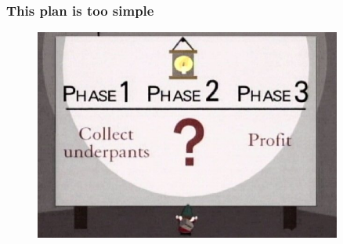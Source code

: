 \begin{frame}
\frametitle{This plan is too simple}

\begin{figure}[htbp]
\begin{center}
\includegraphics[width=0.9\textwidth]{images/underpants-gnomes-2.jpg}
\end{center}
\end{figure}

\end{frame}


